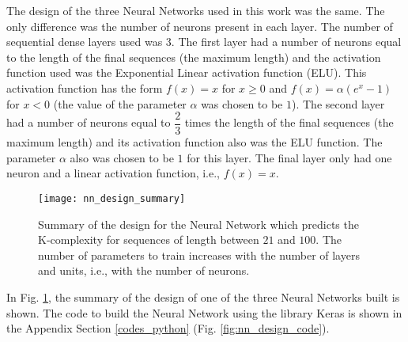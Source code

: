 The design of the three Neural Networks used in this work was the same. The only difference was the number of neurons present in each layer. The number of sequential dense layers used was $3$. The first layer had a number of neurons equal to the length of the final sequences (the maximum length) and the activation function used was the Exponential Linear activation function (ELU). This activation function has the form $f(x)=x$ for $x \geq 0$ and $f(x)=\alpha (e^{x}-1)$ for $x <0$ (the value of the parameter $\alpha$ was chosen to be $1$). The second layer had a number of neurons equal to $\dfrac{2}{3}$ times the length of the final sequences (the maximum length) and its activation function also was the ELU function. The parameter $\alpha$ also was chosen to be $1$ for this layer. The final layer only had one neuron and a linear activation function, i.e., $f(x)=x$.\\

\begin{figure}[h]
	\centering
		\texttt{[image: nn\_design\_summary]}
	\caption[Summary of the design of the Neural Network which predicts the K-complexity of binary sequences.]{Summary of the design for the Neural Network which predicts the K-complexity for sequences of length between $21$ and $100$. The number of parameters to train increases with the number of layers and units, i.e., with the number of neurons.}
	\label{fig:nn_design_summary}
\end{figure}

In Fig. \ref{fig:nn_design_summary}, the summary of the design of one of the three Neural Networks built is shown. The code to build the Neural Network using the library  Keras is shown in the Appendix Section \ref{codes_python} (Fig. \ref{fig:nn_design_code}).


